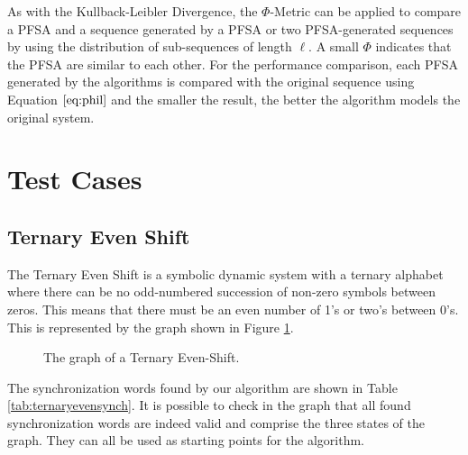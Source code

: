 {As with the Kullback-Leibler Divergence, the $\Phi$-Metric can be applied to compare a PFSA and a sequence generated by a PFSA or two PFSA-generated sequences by using the distribution of sub-sequences of length $\ell$. A small $\Phi$ indicates that the PFSA are similar to each other. For the performance comparison, each PFSA generated by the algorithms is compared with the original sequence using Equation $\ref{eq:phil}$ and the smaller the result, the better the algorithm models the original system.

\section{Test Cases}\label{sec:testcases}

\subsection{Ternary Even Shift}

The Ternary Even Shift is a symbolic dynamic system with a ternary alphabet where there can be no odd-numbered succession of non-zero symbols between zeros. This means that there must be an even number of 1's or two's between 0's. This is represented by the graph shown in Figure \ref{fig:ternaryeven}. 

\begin{figure}
\centering
{}
\caption{The graph of a Ternary Even-Shift.\label{fig:ternaryeven}}
\end{figure}

The synchronization words found by our algorithm are shown in Table \ref{tab:ternaryevensynch}. It is possible to check in the graph that all found synchronization words are indeed valid and comprise the three states of the graph. They can all be used as starting points for the algorithm.

}
